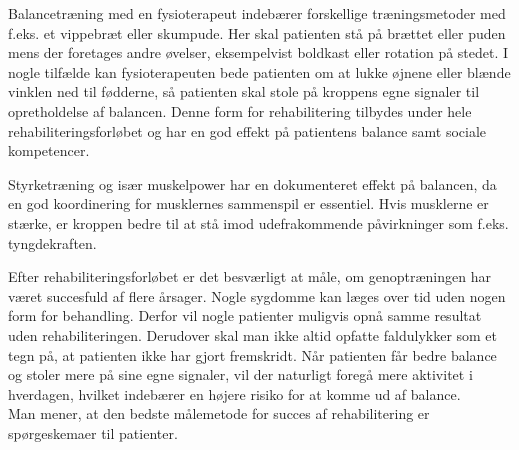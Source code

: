 Balancetræning med en fysioterapeut indebærer forskellige træningsmetoder med f.eks. et vippebræt eller skumpude. Her skal patienten stå på brættet eller puden mens der foretages andre øvelser, eksempelvist boldkast eller rotation på stedet. I nogle tilfælde kan fysioterapeuten bede patienten om at lukke øjnene eller blænde vinklen ned til fødderne, så patienten skal stole på kroppens egne signaler til opretholdelse af balancen. \cite{Joergensen2004} Denne form for rehabilitering tilbydes under hele rehabiliteringsforløbet og har en god effekt på patientens balance samt sociale kompetencer. \cite{Sundhedsstyrelsen2011a}

Styrketræning og især muskelpower har en dokumenteret effekt på balancen, da en god koordinering for musklernes sammenspil er essentiel. Hvis musklerne er stærke, er kroppen bedre til at stå imod udefrakommende påvirkninger som f.eks. tyngdekraften. \cite{Joergensen2004}

Efter rehabiliteringsforløbet er det besværligt at måle, om genoptræningen har været succesfuld af flere årsager. Nogle sygdomme kan læges over tid uden nogen form for behandling. Derfor vil nogle patienter muligvis opnå samme resultat uden rehabiliteringen. Derudover skal man ikke altid opfatte faldulykker som et tegn på, at patienten ikke har gjort fremskridt. Når patienten får bedre balance og stoler mere på sine egne signaler, vil der naturligt foregå mere aktivitet i hverdagen, hvilket indebærer en højere risiko for at komme ud af balance. \cite{Hain2008} \\
Man mener, at den bedste målemetode for succes af rehabilitering er spørgeskemaer til patienter. \cite{Hain2008}
